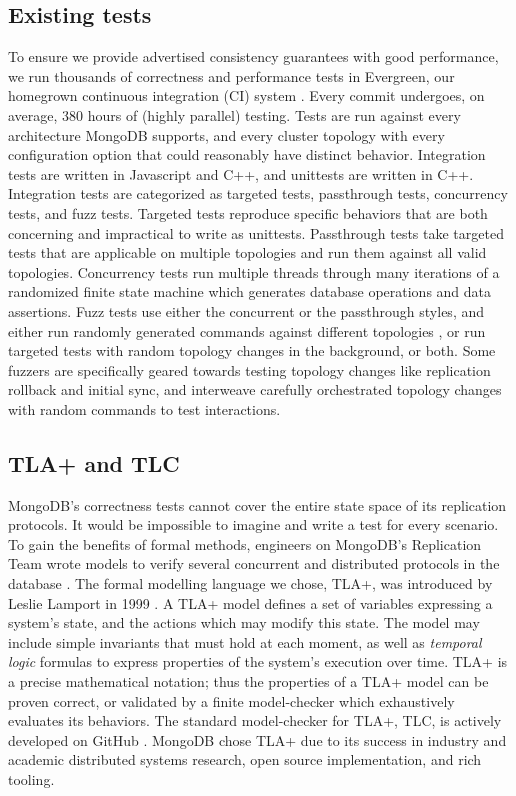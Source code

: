 \documentclass{vldb}
\begin{document}
\subsection{Existing tests}
\label{subsec:background_existing_tests}

To ensure we provide advertised consistency guarantees with good performance, we run thousands of correctness and performance tests in Evergreen, our homegrown continuous integration (CI) system \cite{Daly19iChangePointMongoDB}.
Every commit undergoes, on average, 380 hours of (highly parallel) testing.
Tests are run against every architecture MongoDB supports, and every cluster topology with every configuration option that could reasonably have distinct behavior.
Integration tests are written in Javascript and C++, and unittests are written in C++.
Integration tests are categorized as targeted tests, passthrough tests, concurrency tests, and fuzz tests.
Targeted tests reproduce specific behaviors that are both concerning and impractical to write as unittests.
Passthrough tests take targeted tests that are applicable on multiple topologies and run them against all valid topologies.
Concurrency tests run multiple threads through many iterations of a randomized finite state machine which generates database operations and data assertions.
Fuzz tests use either the concurrent or the passthrough styles, and either run randomly generated commands against different topologies \cite{Guo17MongoDBFuzzTester}, or run targeted tests with random topology changes in the background, or both.
Some fuzzers are specifically geared towards testing topology changes like replication rollback and initial sync, and interweave carefully orchestrated topology changes with random commands to test interactions.

\subsection{TLA+ and TLC}
\label{subsec:background_tla_tlc}

MongoDB's correctness tests cannot cover the entire state space of its replication protocols.
It would be impossible to imagine and write a test for every scenario.
To gain the benefits of formal methods, engineers on MongoDB's Replication Team wrote models to verify several concurrent and distributed protocols in the database \cite{Schultz19BugsLife}.
The formal modelling language we chose, TLA+, was introduced by Leslie Lamport in 1999 \cite{Lamport99TLAPlus, Lamport02SpecifyingSystems}.
A TLA+ model defines a set of variables expressing a system's state, and the actions which may modify this state.
The model may include simple invariants that must hold at each moment, as well as \textit{temporal logic} formulas to express properties of the system's execution over time.
TLA+ is a precise mathematical notation; thus the properties of a TLA+ model can be proven correct, or validated by a finite model-checker which exhaustively evaluates its behaviors.
The standard model-checker for TLA+, TLC, is actively developed on GitHub \cite{TLAPlusGitHub}.
MongoDB chose TLA+ due to its success in industry and academic distributed systems research, open source implementation, and rich tooling.
\end{document}
